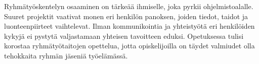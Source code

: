 \documentclass[finnish]{../tktltiki2}
\theoremstyle{definition}
\theoremstyle{remark}
\begin{document}

Ryhmätyöskentelyn osaaminen on tärkeää ihmiselle, joka pyrkii ohjelmistoalalle. Suuret projektit vaativat monen eri henkilön panoksen, joiden tiedot, taidot ja luonteenpiirteet vaihtelevat. Ilman kommunikointia ja yhteistyötä eri henkilöiden kykyjä ei pystytä valjastamaan yhteisen tavoitteen eduksi. Opetuksessa tulisi korostaa ryhmätyötaitojen opettelua, jotta opiskelijoilla on täydet valmiudet olla tehokkaita ryhmän jäseniä työelämässä.

\pagebreak

%
%
% 
%



\end{document}
